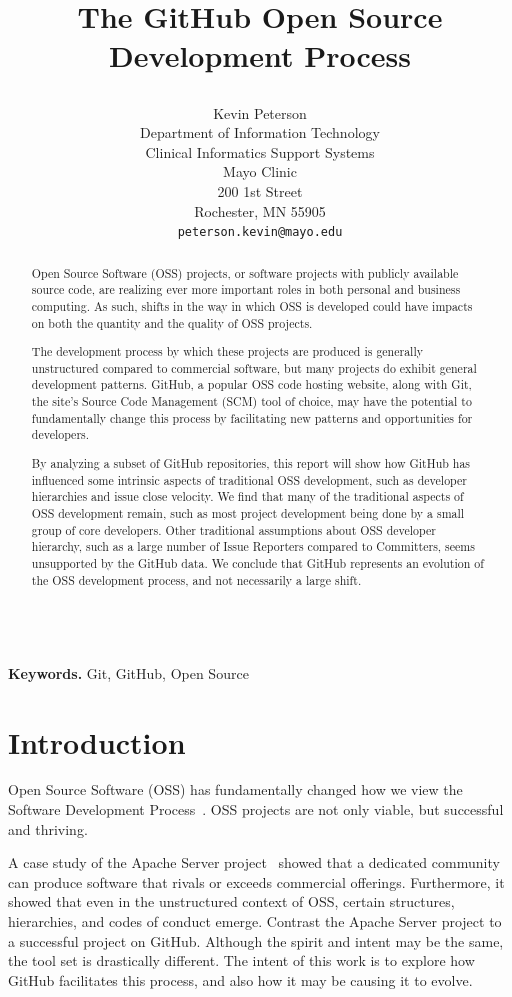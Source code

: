 \documentclass{proc}
\title{
The GitHub Open Source Development Process
\author{Kevin Peterson\\
Department of Information Technology\\
Clinical Informatics Support Systems\\
Mayo Clinic\\
200 1st Street\\
Rochester, MN  55905\\
\small \texttt{peterson.kevin@mayo.edu}
}
}
\begin{document}
\maketitle

\begin{abstract}
Open Source Software (OSS) projects, or software projects with publicly available source code, are realizing ever more important roles in both personal and business computing. As such, shifts in the way in which OSS is developed could have impacts on both the quantity and the quality of OSS projects.

The development process by which these projects are produced is generally unstructured compared to commercial software, but many projects do exhibit general development patterns. GitHub, a popular OSS code hosting website, along with Git, the site's Source Code Management (SCM) tool of choice, may have the potential to fundamentally change this process by facilitating new patterns and opportunities for developers.

By analyzing a subset of GitHub repositories, this report will show how GitHub has influenced some intrinsic aspects of traditional OSS development, such as developer hierarchies and issue close velocity. We find that many of the traditional aspects of OSS development remain, such as most project development being done by a small group of core developers. Other traditional assumptions about OSS developer hierarchy, such as a large number of Issue Reporters compared to Committers, seems unsupported by the GitHub data. We conclude that GitHub represents an evolution of the OSS development process, and not necessarily a large shift.
\end{abstract}

\noindent \\\textbf{Keywords.} Git, GitHub, Open Source

\section{Introduction}
Open Source Software (OSS) has fundamentally changed how we view the Software Development Process~\cite{raymond1999cathedral}. OSS projects are not only viable, but successful and thriving. 

A case study of the Apache Server project~\cite{mockus2000case} showed that a dedicated community can produce software that rivals or exceeds commercial offerings. Furthermore, it showed that even in the unstructured context of OSS, certain structures, hierarchies, and codes of conduct emerge. Contrast the Apache Server project to a successful project on GitHub. Although the spirit and intent may be the same, the tool set is drastically different. The intent of this work is to explore how GitHub facilitates this process, and also how it may be causing it to evolve.
\end{document}
